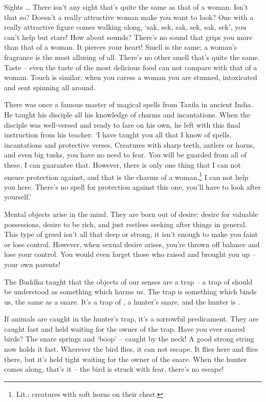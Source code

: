 Sights \ldots{} There isn't any sight that's quite the same as that of a woman. Isn't that so? Doesn't a really attractive woman make you want to look? One with a really attractive figure comes walking along, `sak, sek, sak, sek, sak, sek', you can't help but stare! How about sounds? There's no sound that grips you more than that of a woman. It pierces your heart! Smell is the same; a woman's fragrance is the most alluring of all. There's no other smell that's quite the same. Taste -- even the taste of the most delicious food can not compare with that of a woman. Touch is similar; when you caress a woman you are stunned, intoxicated and sent spinning all around.

There was once a famous master of magical spells from Taxila in ancient India. He taught his disciple all his knowledge of charms and incantations. When the disciple was well-versed and ready to fare on his own, he left with this final instruction from his teacher: `I have taught you all that I know of spells, incantations and protective verses. Creatures with sharp teeth, antlers or horns, and even big tusks, you have no need to fear. You will be guarded from all of these, I can guarantee that. However, there is only one thing that I can not ensure protection against, and that is the charms of a woman.\footnote{Lit.: creatures with soft horns on their chest.} I can not help you here. There's no spell for protection against this one, you'll have to look after yourself.'

Mental objects arise in the mind. They are born out of desire: desire for valuable possessions, desire to be rich, and just restless seeking after things in general. This type of greed isn't all that deep or strong, it isn't enough to make you faint or lose control. However, when sexual desire arises, you're thrown off balance and lose your control. You would even forget those who raised and brought you up -- your own parents!

The Buddha taught that the objects of our senses are a trap -- a trap of   should be understood as something which harms us. The trap is something which binds us, the same as a snare. It's a trap of , a hunter's snare, and the hunter is .

If animals are caught in the hunter's trap, it's a sorrowful predicament. They are caught fast and held waiting for the owner of the trap. Have you ever snared birds? The snare springs and `boop' -- caught by the neck! A good strong string now holds it fast. Wherever the bird flies, it can not escape. It flies here and flies there, but it's held tight waiting for the owner of the snare. When the hunter comes along, that's it -- the bird is struck with fear, there's no escape!

